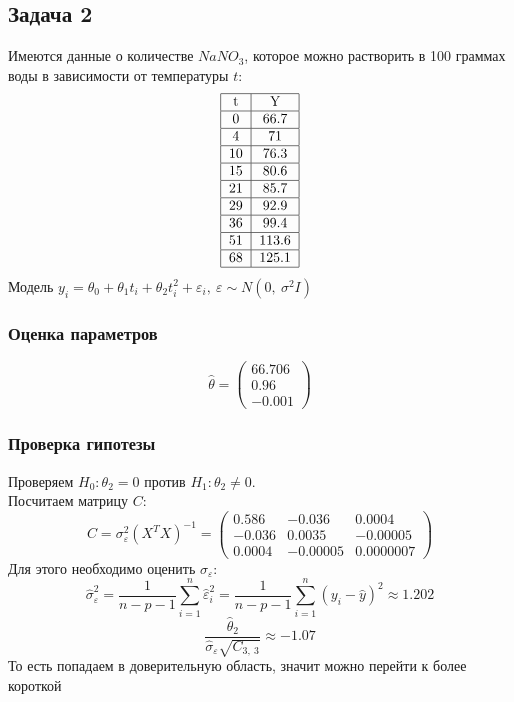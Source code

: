 \documentclass[12pt, a4paper]{article}
\begin{document}
\subsection*{Задача 2}
Имеются данные о количестве $NaNO_3$, которое можно растворить в 100 граммах воды в зависимости от температуры $t$:
\[
\begin{tabular}{|c|c|}
    \hline
    t & Y\\
    \hline
    0 & 66.7\\
    \hline
    4 & 71\\
    \hline
    10& 76.3\\
    \hline
    15& 80.6\\
    \hline
    21& 85.7\\
    \hline
    29& 92.9\\
    \hline
    36& 99.4\\
    \hline
    51& 113.6\\
    \hline
    68& 125.1\\
    \hline
\end{tabular}
\]
Модель $y_i = \theta_0 + \theta_1 t_i + \theta_2 t_i^2 + \varepsilon_i,\ \varepsilon\sim N(0,\ \sigma^2 I)$
\subsubsection*{Оценка параметров}
\[
\hat \theta = \begin{pmatrix}
    66.706\\
    0.96\\
    -0.001
\end{pmatrix}
\]
\subsubsection*{Проверка гипотезы}
Проверяем $H_0: \theta_2 = 0$ против $H_1: \theta_2 \neq 0$.\\
Посчитаем матрицу $C$:
\[
C = \sigma^2_{\varepsilon} \left( X^T X \right)^{-1} = \begin{pmatrix}
    0.586 & -0.036 & 0.0004\\
    -0.036 & 0.0035 & -0.00005\\
    0.0004 & -0.00005 & 0.0000007
\end{pmatrix}
\]
Для этого необходимо оценить $\sigma_{\varepsilon}$:
\[
\hat \sigma^2_{\varepsilon} = \frac{1}{n - p - 1} \sum_{i = 1}^{n} \hat \varepsilon^2_i = \frac{1}{n - p - 1} \sum_{i = 1}^{n} {\left( y_i - \hat y \right)}^2 \approx 1.202
\]
\[
\frac{\hat \theta_2}{\hat\sigma_{\varepsilon}\sqrt{C_{3,\ 3}}} \approx -1.07
\]
То есть попадаем в доверительную область, значит можно перейти к более короткой 
\end{document}

